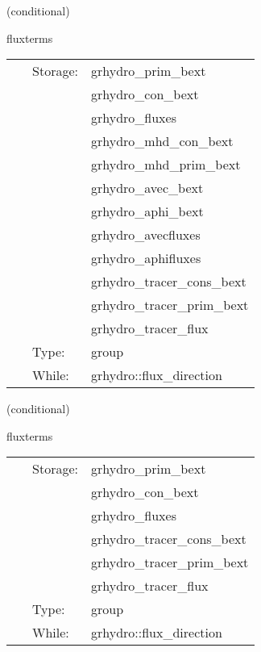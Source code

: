 \vspace{5mm}

   (conditional) 

\hspace{5mm} fluxterms 

\hspace{5mm}{\it calculation of intercell fluxes } 


\hspace{5mm}

 \begin{tabular*}{160mm}{cll} 
~ & Storage:  & grhydro\_prim\_bext \\ 
~& ~ &grhydro\_con\_bext\\ 
~& ~ &grhydro\_fluxes\\ 
~& ~ &grhydro\_mhd\_con\_bext\\ 
~& ~ &grhydro\_mhd\_prim\_bext\\ 
~& ~ &grhydro\_avec\_bext\\ 
~& ~ &grhydro\_aphi\_bext\\ 
~& ~ &grhydro\_avecfluxes\\ 
~& ~ &grhydro\_aphifluxes\\ 
~& ~ &grhydro\_tracer\_cons\_bext\\ 
~& ~ &grhydro\_tracer\_prim\_bext\\ 
~& ~ &grhydro\_tracer\_flux\\ 
~ & Type:  & group \\ 
~ & While:  & grhydro::flux\_direction \\ 
\end{tabular*} 


\vspace{5mm}

   (conditional) 

\hspace{5mm} fluxterms 

\hspace{5mm}{\it calculation of intercell fluxes } 


\hspace{5mm}

 \begin{tabular*}{160mm}{cll} 
~ & Storage:  & grhydro\_prim\_bext \\ 
~& ~ &grhydro\_con\_bext\\ 
~& ~ &grhydro\_fluxes\\ 
~& ~ &grhydro\_tracer\_cons\_bext\\ 
~& ~ &grhydro\_tracer\_prim\_bext\\ 
~& ~ &grhydro\_tracer\_flux\\ 
~ & Type:  & group \\ 
~ & While:  & grhydro::flux\_direction \\ 
\end{tabular*} 



